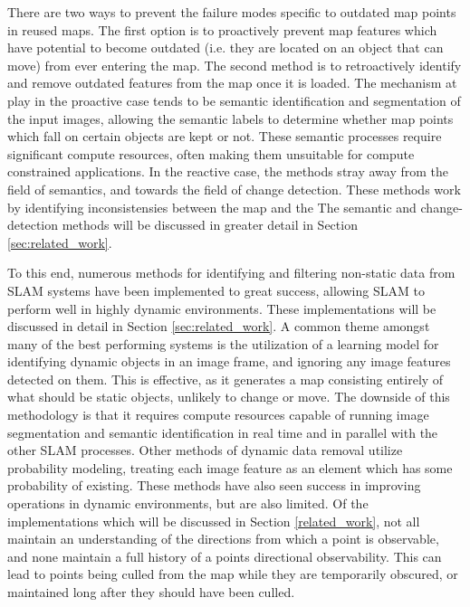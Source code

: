 There are two ways to prevent the failure modes specific to outdated map points in reused maps. The first option is to proactively prevent map features which have potential to become outdated (i.e. they are located on an object that can move) from ever entering the map. The second method is to retroactively identify and remove outdated features from the map once it is loaded. The mechanism at play in the proactive case tends to be semantic identification and segmentation of the input images, allowing the semantic labels to determine whether map points which fall on certain objects are kept or not. These semantic processes require significant compute resources, often making them unsuitable for compute constrained applications. In the reactive case, the methods stray away from the field of semantics, and towards the field of change detection. These methods work by identifying inconsistensies between the map and the The semantic and change-detection methods will be discussed in greater detail in Section \ref{sec:related_work}.

To this end, numerous methods for identifying and filtering non-static data from SLAM systems have been implemented to great success, allowing SLAM to perform well in highly dynamic environments. These implementations will be discussed in detail in Section \ref{sec:related_work}. A common theme amongst many of the best performing systems is the utilization of a learning model for identifying dynamic objects in an image frame, and ignoring any image features detected on them. This is effective, as it generates a map consisting entirely of what should be static objects, unlikely to change or move. The downside of this methodology is that it requires compute resources capable of running image segmentation and semantic identification in real time and in parallel with the other SLAM processes. Other methods of dynamic data removal utilize probability modeling, treating each image feature as an element which has some probability of existing. These methods have also seen success in improving operations in dynamic environments, but are also limited. Of the implementations which will be discussed in Section \ref{related_work}, not all maintain an understanding of the directions from which a point is observable, and none maintain a full history of a points directional observability. This can lead to points being culled from the map while they are temporarily obscured, or maintained long after they should have been culled.


